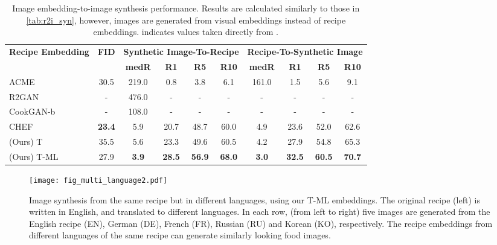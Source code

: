 \documentclass[sigconf,nonacm]{acmart}
\begin{document}
\begin{table*}[!ht]
  \centering
  \small
  \caption{Image embedding-to-image synthesis performance. 
Results
  are calculated similarly to those in \autoref{tab:r2i_syn}, however, images are generated from visual embeddings instead of recipe embeddings.  indicates values taken directly from \cite{zhu2020}.}\begin{tabular}{l|c|cccc|cccc}
    \toprule
    \multicolumn{1}{c|}{\multirow{2}[4]{*}{\textbf{Recipe Embedding}}} & \multirow{2}[4]{*}{\textbf{FID} } & \multicolumn{4}{c|}{\textbf{Synthetic Image-To-Recipe}} & \multicolumn{4}{c}{\textbf{Recipe-To-Synthetic Image}} \\
\cmidrule{3-10}           &        & \textbf{medR}   & \textbf{R1}   & \textbf{R5}    & \textbf{R10}  & \textbf{medR}   & \textbf{R1}    & \textbf{R5}    & \textbf{R10}  \\
    \midrule
    ACME~\cite{wang2019} & 30.5 & 219.0  & 0.8    & 3.8    & 6.1    & 161.0  & 1.5    & 5.6    & 9.1 \\
    R2GAN~\cite{Zhu2019} & - & 476.0  & -    & -    & -    & -  & -    & -    & - \\
    CookGAN-b~\cite{zhu2020} & - & 108.0  & -    & -    & -    & -  & -    & -    & - \\
    CHEF~\cite{chef2021} & \textbf{23.4}  & 5.9    & 20.7   & 48.7   & 60.0   & 4.9    & 23.6   & 52.0   & 62.6 \\
    (Ours) T & 35.5 & 5.6    & 23.3   & 49.6   & 60.5   & 4.2    & 27.9   & 54.8   & 65.3 \\
    (Ours) T-ML & 27.9 & \textbf{3.9} & \textbf{28.5} & \textbf{56.9} & \textbf{68.0} & \textbf{3.0} & \textbf{32.5} & \textbf{60.5} & \textbf{70.7} \\
    \bottomrule
    \end{tabular}\label{tab:i2i_syn}\end{table*}

\begin{figure*}[!ht]
\centering
\texttt{[image: fig\_multi\_language2.pdf]}
\caption{Image synthesis from the same recipe but in different languages, using our T-ML embeddings. The original recipe (left) is written in English, and translated to different languages. In each row, (from left to right) five images are generated from the English recipe (EN), German (DE), French (FR), Russian (RU) and Korean (KO), respectively. The recipe embeddings from different languages of the same recipe can generate similarly looking food images.}
\label{fig:syn_multi_lang}
\end{figure*}
\end{document}
